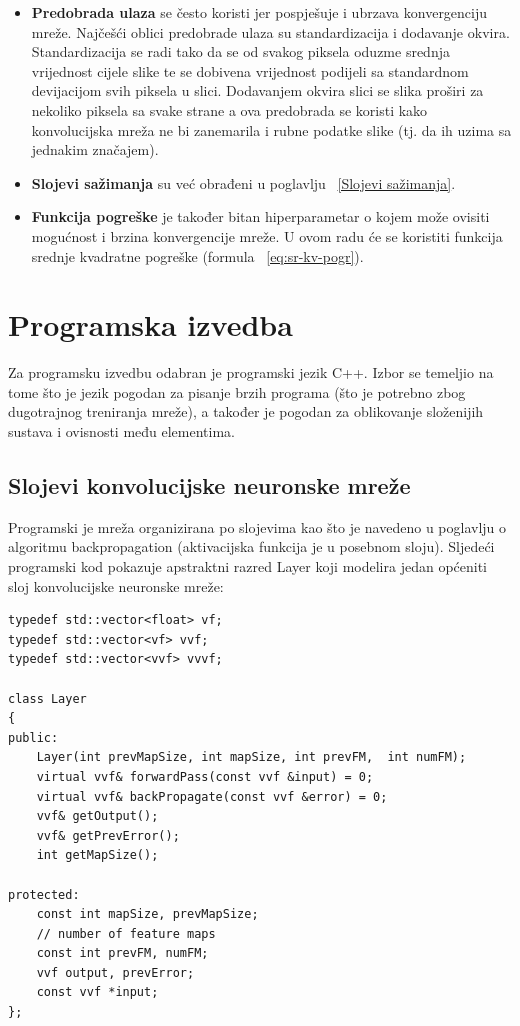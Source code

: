 \documentclass[times, utf8, zavrsni, numeric]{fer}
\begin{document}
\begin{itemize}
\item \textbf{Predobrada ulaza} se često koristi jer pospješuje i ubrzava konvergenciju mreže. Najčešći oblici predobrade ulaza su standardizacija i dodavanje okvira. Standardizacija se radi tako da se od svakog piksela oduzme srednja vrijednost cijele slike te se dobivena vrijednost podijeli sa standardnom devijacijom svih piksela u slici. Dodavanjem okvira slici se slika proširi za nekoliko piksela sa svake strane a ova predobrada se koristi kako konvolucijska mreža ne bi zanemarila i rubne podatke slike (tj. da ih uzima sa jednakim značajem).

\item \textbf{Slojevi sažimanja} su već obrađeni u poglavlju ~\ref{Slojevi sažimanja}.

\item \textbf{Funkcija pogreške} je također bitan hiperparametar o kojem može ovisiti mogućnost i brzina konvergencije mreže. U ovom radu će se koristiti funkcija srednje kvadratne pogreške (formula ~\ref{eq:sr-kv-pogr}).

\end{itemize}

\chapter{Programska izvedba}
Za programsku izvedbu odabran je programski jezik C++. Izbor se temeljio na tome što je jezik pogodan za pisanje brzih programa (što je potrebno zbog dugotrajnog treniranja mreže), a također je pogodan za oblikovanje složenijih sustava i ovisnosti među elementima. 

\section{Slojevi konvolucijske neuronske mreže}
Programski je mreža organizirana po slojevima kao što je navedeno u poglavlju o algoritmu backpropagation (aktivacijska funkcija je u posebnom sloju). Sljedeći programski kod pokazuje apstraktni razred Layer koji modelira jedan općeniti sloj konvolucijske neuronske mreže:

\renewcommand{\lstlistingname}{Programski kod}
\begin{lstlisting}[caption=Razred Layer,
  label=Layer]
typedef std::vector<float> vf;
typedef std::vector<vf> vvf;
typedef std::vector<vvf> vvvf;

class Layer
{
public:
    Layer(int prevMapSize, int mapSize, int prevFM,  int numFM);
    virtual vvf& forwardPass(const vvf &input) = 0;
    virtual vvf& backPropagate(const vvf &error) = 0;
    vvf& getOutput();
    vvf& getPrevError();
    int getMapSize();

protected:
    const int mapSize, prevMapSize;
    // number of feature maps
    const int prevFM, numFM;
    vvf output, prevError;
    const vvf *input;
};
\end{lstlisting}
\end{document}
